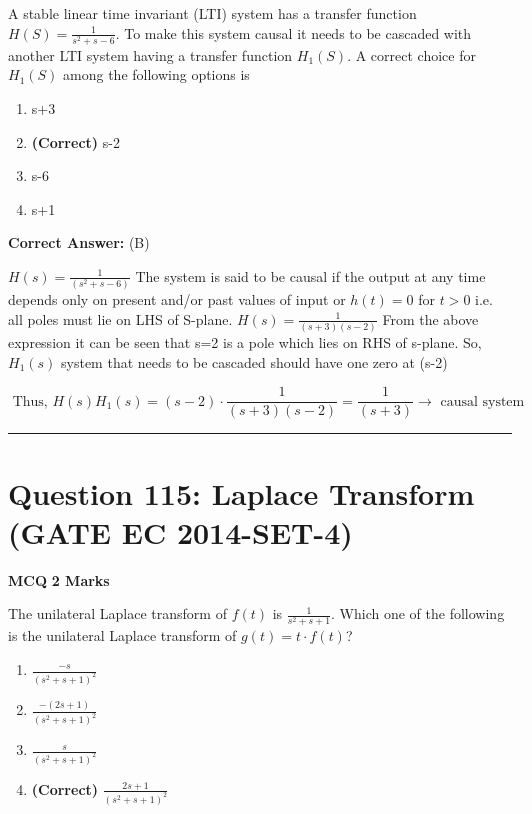 \documentclass[11pt,a4paper]{article}
\begin{document}
\noindent A stable linear time invariant (LTI) system has a transfer function $H(S)=\frac{1}{s^{2}+s-6}$. To make this system causal it needs to be cascaded with another LTI system having a transfer function $H_{1}(S)$. A correct choice for $H_{1}(S)$ among the following options is


\begin{enumerate}[label=(\Alph*)]
    \item s+3
    \item \textbf{(Correct)} s-2
    \item s-6
    \item s+1
\end{enumerate}

\noindent \textbf{Correct Answer:} (B)

\begin{tcolorbox}[solbox, title=Detailed Solution -- Question 114]
$H(s)=\frac{1}{\left(s^{2}+s-6\right)}$
 The system is said to be causal if the output at  any time depends only on present and/or past values of input or 
$h(t)=0$ for $t > 0$
 i.e. all poles must lie on LHS of S-plane.
$H(s)=\frac{1}{(s+3)(s-2)}$
 From the above expression it can be seen that s=2 is a pole which lies on RHS of s-plane. So, $H_{1}(s)$ system that needs to be cascaded should have one zero at (s-2)

\[
\text { Thus, } H(s) H_{1}(s)=(s-2) \cdot \frac{1}{(s+3)(s-2)}  =\frac{1}{(s+3)} \rightarrow \text { causal system }
\]
\end{tcolorbox}

\vspace{1.5em}
\hrule
\vspace{1.5em}

\section*{Question 115: Laplace Transform (GATE EC 2014-SET-4)}
\noindent \textbf{\color{primary}MCQ} \hfill \textbf{\color{secondary}2 Marks}


\noindent The unilateral Laplace transform of $f (t)$ is $\frac{1}{s^{2}+s+1}$. Which one of the following is the unilateral Laplace transform of $g(t) = t \cdot f(t)$?


\begin{enumerate}[label=(\Alph*)]
    \item $\frac{-s}{(s^2+s+1)^{2}}$
    \item $\frac{-(2s+1)}{(s^2+s+1)^{2}}$
    \item $\frac{s}{(s^2+s+1)^{2}}$
    \item \textbf{(Correct)} $\frac{2s+1}{(s^2+s+1)^{2}}$
\end{enumerate}
\end{document}
